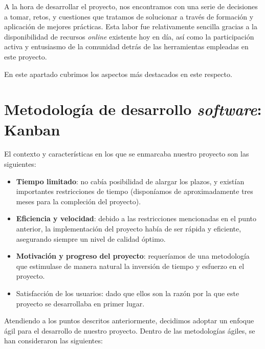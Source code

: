 
A la hora de desarrollar el proyecto, nos encontramos con una serie de decisiones a tomar, retos, y cuestiones que tratamos de solucionar a través de formación y aplicación de mejores prácticas. Esta labor fue relativamente sencilla gracias a la disponibilidad de recursos \emph{online} existente hoy en día, así como la participación activa y entusiasmo de la comunidad detrás de las herramientas empleadas en este proyecto.

En este apartado cubrimos los aspectos más destacados en este respecto.

\section{Metodología de desarrollo \emph{software}: Kanban}

El contexto y características en los que se enmarcaba nuestro proyecto son las siguientes:

\vspace{-0.5cm}
\begin{itemize}
	\item [\textbullet] \textbf{Tiempo limitado}: no cabía posibilidad de alargar los plazos, y existían importantes restricciones de tiempo (disponíamos de aproximadamente tres meses para la compleción del proyecto).
	\item [\textbullet] \textbf{Eficiencia y velocidad}: debido a las restricciones mencionadas en el punto anterior, la implementación del proyecto había de ser rápida y eficiente, asegurando siempre un nivel de calidad óptimo.
	\item [\textbullet] \textbf{Motivación y progreso del proyecto}: requeríamos de una metodología que estimulase de manera natural la inversión de tiempo y esfuerzo en el proyecto.
	\item [\textbullet] Satisfacción de los usuarios: dado que ellos son la razón por la que este proyecto se desarrollaba en primer lugar.
\end{itemize}

Atendiendo a los puntos descritos anteriormente, decidimos adoptar un enfoque ágil para el desarrollo de nuestro proyecto. Dentro de las metodologías ágiles, se han consideraron las siguientes:


